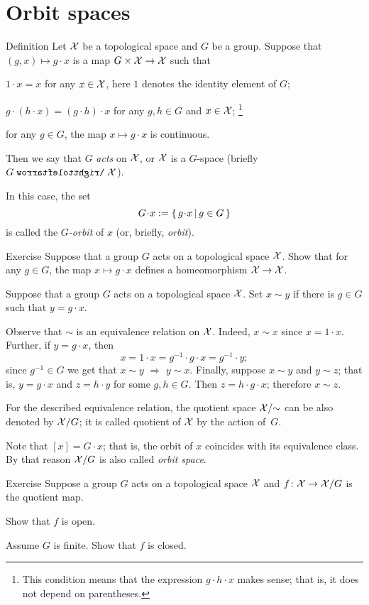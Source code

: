 \section{Orbit spaces}

\begin{thm}{Definition}
Let $\mathcal{X}$ be a topological space and $G$ be a group.
Suppose that $(g,x)\mapsto g\cdot x$ is a map $G\times\mathcal{X}\to \mathcal{X}$ such that
\begin{subthm}{}
$1\cdot x=x$ for any $x\in \mathcal{X}$, here $1$ denotes the identity element of $G$;
\end{subthm}
\begin{subthm}{}
$g\cdot (h\cdot x)=(g\cdot h)\cdot x$ for any $g,h\in G$ and $x\in \mathcal{X}$;%
\footnote{This condition means that the expression $g\cdot h\cdot x$ makes sense; that is, it does not depend on parentheses.}
\end{subthm}
\begin{subthm}{}
for any $g\in G$, the map $x\mapsto g\cdot x$ is continuous.
\end{subthm}
Then we say that $G$ \emph{acts} on $\mathcal{X}$, or $\mathcal{X}$ is a $G$-space (briefly $G\acts \c{X}$).

In this case, the set
\[G\cdot x:=\set{g\cdot x}{g\in G}\]
is called the \emph{$G$-orbit} of $x$ (or, briefly, \emph{orbit}).
\end{thm}

\begin{thm}{Exercise}
Suppose that a group $G$ acts on a topological space $\mathcal{X}$.
Show that for any $g\in G$, the map $x\mapsto g\cdot x$ defines a homeomorphism $\mathcal{X}\to \mathcal{X}$.
\end{thm}

Suppose that a group $G$ acts on a topological space $\mathcal{X}$.
Set $x\sim y$ if there is $g\in G$ such that $y=g\cdot x$.

Observe that $\sim$ is an equivalence relation on $\mathcal{X}$.
Indeed, 
$x\sim x$ since $x=1\cdot x$.
Further, if $y=g\cdot x$, then 
\[x=1\cdot x=g^{-1}\cdot g\cdot  x=g^{-1}\cdot y;\] since $g^{-1}\in G$ we get that $x\sim y$
$\Longrightarrow$
$y\sim x$.
Finally, suppose $x\sim y$ and $y\sim z$;
that is, $y=g\cdot x$ and $z=h\cdot y$ for some $g,h\in G$.
Then $z=h\cdot g\cdot x$;
therefore $x\sim z$.

For the described equivalence relation, the quotient space $\mathcal{X}/{\sim}$ can be also denoted by $\mathcal{X}/G$;
it is called quotient of $\mathcal{X}$ by the action of~$G$.

Note that $[x]=G\cdot x$; that is, the orbit of $x$ coincides with its equivalence class.
By that reason $\mathcal{X}/G$ is also called \emph{orbit space}.

\begin{thm}{Exercise}
Suppose a group $G$ acts on a topological space $\mathcal{X}$ and $f\colon\mathcal{X}\to \mathcal{X}/G$ is the quotient map.

\begin{subthm}{}
Show that $f$ is open.
\end{subthm}

\begin{subthm}{}
Assume $G$ is finite.
Show that $f$ is closed.
\end{subthm}

\end{thm}

